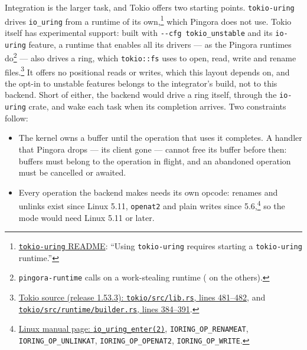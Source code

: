 Integration is the larger task, and Tokio offers two starting points.
\texttt{tokio-uring} drives \texttt{io\_uring} from a runtime of its
own,\footnote{\href{https://github.com/tokio-rs/tokio-uring\#getting-started}{\texttt{tokio-uring}
README}: ``Using \texttt{tokio-uring} requires starting a
\texttt{tokio-uring} runtime.''} which Pingora does not use. Tokio itself
has experimental support: built with \texttt{-{}-cfg tokio\_unstable} and
its \texttt{io-uring} feature, a runtime that enables all its drivers ---
as the Pingora runtimes
do\footnote{\texttt{pingora-runtime} calls
 on a
work-stealing runtime ( on the
others).} --- also drives a ring, which \texttt{tokio::fs} uses
to open, read, write and rename
files.\footnote{\href{https://github.com/tokio-rs/tokio/blob/tokio-1.53.3/tokio/src/lib.rs\#L481-L482}{Tokio
source (release 1.53.3): \texttt{tokio/src/lib.rs}, lines 481--482}, and
\href{https://github.com/tokio-rs/tokio/blob/tokio-1.53.3/tokio/src/runtime/builder.rs\#L384-L391}{\texttt{tokio/src/runtime/builder.rs},
lines 384--391}.} It offers no positional reads or writes, which this
layout depends on, and the opt-in to unstable features belongs to the
integrator's build, not to this backend. Short of either, the backend would
drive a ring itself, through the \texttt{io-uring} crate, and wake each task
when its completion arrives. Two constraints follow:
\begin{itemize}
  \item The kernel owns a buffer until the operation that uses it
    completes. A handler that Pingora drops --- its client gone --- cannot
    free its buffer before then: buffers must belong to the operation in
    flight, and an abandoned operation must be cancelled or awaited.
  \item Every operation the backend makes needs its own opcode: renames and
    unlinks exist since Linux 5.11, \texttt{openat2} and plain writes since
    5.6,\footnote{\href{https://man7.org/linux/man-pages/man2/io_uring_enter.2.html}{Linux
    manual page: \texttt{io\_uring\_enter(2)}}, \texttt{IORING\_OP\_RENAMEAT},
    \texttt{IORING\_OP\_UNLINKAT}, \texttt{IORING\_OP\_OPENAT2},
    \texttt{IORING\_OP\_WRITE}.} so the mode would need Linux 5.11 or later.
\end{itemize}

